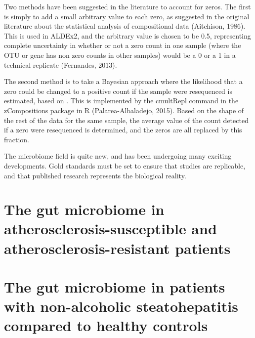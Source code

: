 Two methods have been suggested in the literature to account for zeros. The first is simply to add a small arbitrary value to each zero, as suggested in the original literature about the statistical analysis of compositional data (Aitchison, 1986). This is used in ALDEx2, and the arbitrary value is chosen to be 0.5, representing complete uncertainty in whether or not a zero count in one sample (where the OTU or gene has non zero counts in other samples) would be a 0 or a 1 in a technical replicate (Fernandes, 2013).

The second method is to take a Bayesian approach where the likelihood that a zero could be changed to a positive count if the sample were resequenced is estimated, based on . This is implemented by the cmultRepl command in the zCompositions package in R (Palarea-Albaladejo, 2015). Based on the shape of the rest of the data for the same sample, the average value of the count detected if a zero were resequenced is determined, and the zeros are all replaced by this fraction.

The microbiome field is quite new, and has been undergoing many exciting developments. Gold standards must be set to ensure that studies are replicable, and that published research represents the biological reality.

\section{The gut microbiome in atherosclerosis-susceptible and atherosclerosis-resistant patients}

\section{The gut microbiome in patients with non-alcoholic steatohepatitis compared to healthy controls}












